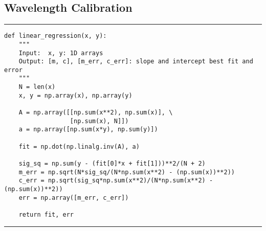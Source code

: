 \documentclass[preprint]{aastex62}
\begin{document}
\subsection{Wavelength Calibration} \label{code:wavecal}
\small
\hrule
\begin{lstlisting}
def linear_regression(x, y):
    """
    Input:  x, y: 1D arrays
    Output: [m, c], [m_err, c_err]: slope and intercept best fit and error
    """
    N = len(x)
    x, y = np.array(x), np.array(y)

    A = np.array([[np.sum(x**2), np.sum(x)], \
                  [np.sum(x), N]])
    a = np.array([np.sum(x*y), np.sum(y)])

    fit = np.dot(np.linalg.inv(A), a)

    sig_sq = np.sum(y - (fit[0]*x + fit[1]))**2/(N + 2)
    m_err = np.sqrt(N*sig_sq/(N*np.sum(x**2) - (np.sum(x))**2))
    c_err = np.sqrt(sig_sq*np.sum(x**2)/(N*np.sum(x**2) - (np.sum(x))**2))
    err = np.array([m_err, c_err])

    return fit, err
\end{lstlisting}
\hrule \vspace{7pt}
\end{document}
